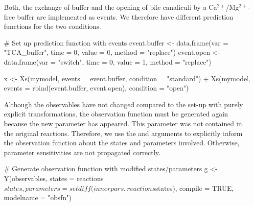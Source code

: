 \documentclass[article]{jss}
\begin{document}
\begin{CodeChunk}
\end{CodeChunk}

Both, the exchange of buffer and the opening of bile canaliculi by a Ca$^{2+}$/Mg$^{2+}$-free buffer are implemented as events. We therefore have different prediction functions for the two conditions.

\begin{CodeChunk}
\begin{CodeInput}
# Set up prediction function with events
event.buffer <- data.frame(var = "TCA_buffer",
			   time = 0,
			   value = 0,
			   method = "replace")
event.open   <- data.frame(var = "switch",
			   time = 0,
			   value = 1,
			   method = "replace")

x <- Xs(mymodel,
	events = event.buffer,
	condition = "standard") +
     Xs(mymodel,
        events = rbind(event.buffer, event.open),
	condition = "open")
\end{CodeInput}
\end{CodeChunk}

Although the observables have not changed compared to the set-up with purely explicit transformations, the observation function must be generated again because the new parameter  has appeared. This parameter was not contained in the original reactions. Therefore, we use the  and  arguments to explicitly inform the observation function about the states and parameters involved. Otherwise, parameter sensitivities are not propagated correctly.

\begin{CodeChunk}
\begin{CodeInput}
# Generate observation function with modified states/parameters
g <- Y(observables,
       states = reactions$states,
       parameters = setdiff(innerpars, reactions$states),
       compile = TRUE, modelname = "obsfn")
\end{CodeInput}
\end{CodeChunk}
\end{document}
